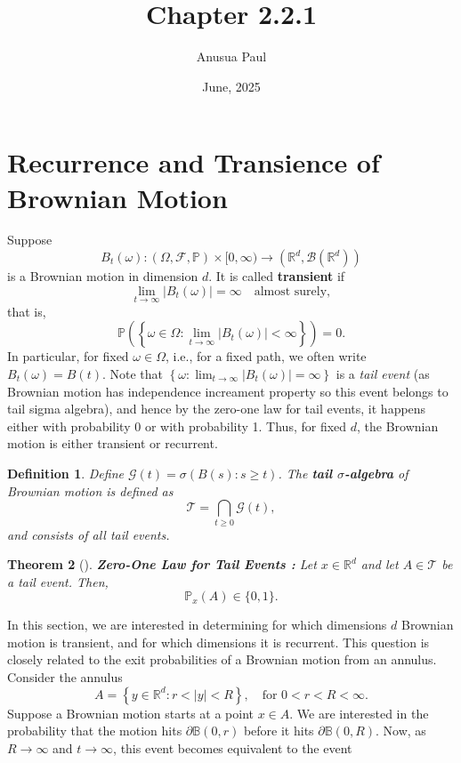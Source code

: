 \documentclass{article}
\title{Chapter 2.2.1}
\author{Anusua Paul}
\date{June, 2025}
\numberwithin{equation}{section}
\newtheorem{theorem}{Theorem}[section]
\newtheorem{definition}[theorem]{Definition}
\newcommand{\F}{\mathscr{F}}
\newcommand{\pp}{\mathbb{P}}
\begin{document}
\maketitle

\section{Recurrence and Transience of Brownian Motion}

Suppose 
\[
B_t(\omega) : (\Omega, \F, \pp) \times [0, \infty) \to (\mathbb{R}^d, \mathscr{B}(\mathbb{R}^d))
\]
is a Brownian motion in dimension \( d \). It is called \textbf{transient} if
\[
\lim_{t \to \infty} |B_t(\omega)| = \infty \quad \text{almost surely},
\]
that is,
\[
\pp\left( \left\{ \omega \in \Omega : \lim_{t \to \infty} |B_t(\omega)| < \infty \right\} \right) = 0.
\]
In particular, for fixed \( \omega \in \Omega \), i.e., for a fixed path, we often write \( B_t(\omega) = B(t) \).
Note that  \(
\left\{ \omega :\lim_{t \to \infty} |B_t(\omega)| = \infty \right\}
\) is a \textit{tail event} (as Brownian motion has independence increament property so this event belongs to tail sigma algebra), and hence by the zero-one law for tail events, it happens either with probability 0 or with probability 1. Thus, for fixed \( d \), the Brownian motion is either transient or recurrent.
\begin{definition}
Define \( \mathscr{G}(t) = \sigma(B(s) : s \geq t) \). The \textbf{tail \(\sigma\)-algebra} of Brownian motion  is defined as
\[
\mathscr{T} = \bigcap_{t \geq 0} \mathscr{G}(t),
\]
and consists of all tail events.
\end{definition}
\begin{theorem}[{\cite[Theorem 2.9]{PeresMortersBook}}]
\textbf{Zero-One Law for Tail Events : } Let \( x \in \mathbb{R}^d \) and let \( A \in \mathscr{T} \) be a tail event. Then,
\[
\mathbb{P}_x(A) \in \{0, 1\}.
\]
\end{theorem}
\noindent In this section, we are interested in determining for which dimensions \( d \) Brownian motion is transient, and for which dimensions it is recurrent. This question is closely related to the exit probabilities of a Brownian motion from an annulus.
Consider the annulus
\[
A = \left\{ y \in \mathbb{R}^d : r < |y| < R \right\}, \quad \text{for } 0 < r < R < \infty.
\]
Suppose a Brownian motion starts at a point \( x \in A \). We are interested in the probability that the motion hits \( \partial \mathbb{B}(0, r) \) before it hits \( \partial \mathbb{B}(0, R) \). 
Now, as \( R \to \infty \) and \( t \to \infty \), this event becomes equivalent to the event 
\end{document}
